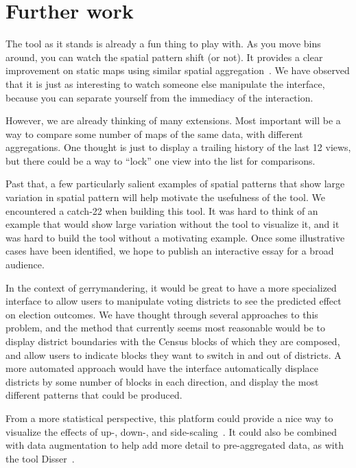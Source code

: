 \documentclass{article}\usepackage[]{graphicx}\usepackage[]{color}
\begin{document}
\section{Further work}

The tool as it stands is already a fun thing to play with. As you move bins around, you can watch the spatial pattern shift (or not). It provides a clear improvement on static maps using similar spatial aggregation~\citep{SulTelWoo2008, Fel2015}. We have observed that it is just as interesting to watch someone else manipulate the interface, because you can separate yourself from the immediacy of the interaction. 

However, we are already thinking of many extensions. Most important will be a way to compare some number of maps of the same data, with different aggregations. One thought is just to display a trailing history of the last 12 views, but there could be a way to ``lock'' one view into the list for comparisons. 

Past that, a few particularly salient examples of spatial patterns that show large variation in spatial pattern will help motivate the usefulness of the tool. We encountered a catch-22 when building this tool. It was hard to think of an example that would show large variation without the tool to visualize it, and it was hard to build the tool without a motivating example. Once some illustrative cases have been identified, we hope to publish an interactive essay for a broad audience. 

In the context of gerrymandering, it would be great to have a more specialized interface to allow users to manipulate voting districts to see the predicted effect on election outcomes. We have thought through several approaches to this problem, and the method that currently seems most reasonable would be to display district boundaries with the Census blocks of which they are composed, and allow users to indicate blocks they want to switch in and out of districts. A more automated approach would have the interface automatically displace districts by some number of blocks in each direction, and display the most different patterns that could be produced. 

From a more statistical perspective, this platform could provide a nice way to visualize the effects of up-, down-, and side-scaling~\citep{Atk2013, Kyr2004}. It could also be combined with data augmentation to help add more detail to pre-aggregated data, as with the tool Disser~\citep{Mar2014}. 

\clearpage




 


\end{document}
